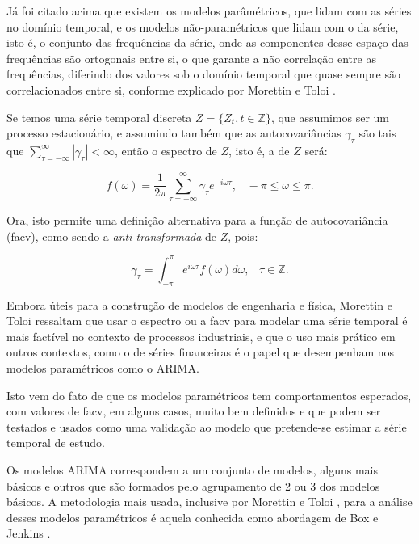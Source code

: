 Já foi citado acima que existem os modelos parâmétricos, que lidam com as séries no domínio temporal, e os modelos não-paramétricos que lidam com o  da série, isto é, o conjunto das frequências da série, onde as componentes desse espaço das frequências são ortogonais entre si, o que garante a não correlação entre as frequências, diferindo dos valores sob o domínio temporal que quase sempre são correlacionados entre si, conforme explicado por Morettin e Toloi \citep{morettin}.

Se temos uma série temporal discreta $Z = \{ Z_t, t \in \mathbb{Z} \}$, que assumimos ser um processo estacionário, e assumindo também que as autocovariâncias $\gamma_\tau$ são tais que $\sum_{\tau=-\infty}^{\infty} |\gamma_\tau| < \infty$, então o espectro de $Z$, isto é, a  de $Z$ será:

\begin{equation}\label{series:2.33}
f(\omega) = \frac{1}{2\pi} \sum_{\tau=-\infty}^{\infty} \gamma_\tau e^{-i\omega\tau}, \;\;\; -\pi\leq\omega\leq\pi.
\end{equation}

Ora, isto permite uma definição alternativa para a função de autocovariância (facv), como sendo a \emph{anti-transformada} de $Z$, pois:

\begin{equation}\label{series:2.34}
\gamma_\tau = \int_{-\pi}^{\pi} e^{i\omega\tau} f(\omega) d\omega, \;\;\; \tau \in \mathbb{Z}.
\end{equation}

Embora úteis para a construção de modelos de engenharia e física, Morettin e Toloi \citep{morettin} ressaltam que usar o espectro ou a facv para modelar uma série temporal é mais factível no contexto de processos industriais, e que o uso mais prático em outros contextos, como o de séries financeiras é o papel que desempenham nos modelos paramétricos como o ARIMA.

Isto vem do fato de que os modelos paramétricos tem comportamentos esperados, com valores de facv, em alguns casos, muito bem definidos e que podem ser testados e usados como uma validação ao modelo que pretende-se estimar a série temporal de estudo.

Os modelos ARIMA correspondem a um conjunto de modelos, alguns mais básicos e outros que são formados pelo agrupamento de 2 ou 3 dos modelos básicos. A metodologia mais usada, inclusive por Morettin e Toloi \citep{morettin}, para a análise desses modelos paramétricos é aquela conhecida como abordagem de Box e Jenkins \citep{box}.

